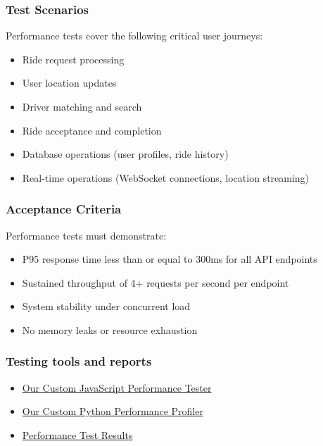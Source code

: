 \documentclass[a4paper,12pt]{article}
\begin{document}
\subsubsection{Test Scenarios}
Performance tests cover the following critical user journeys:
\begin{itemize}
    \item Ride request processing
    \item User location updates
    \item Driver matching and search
    \item Ride acceptance and completion
    \item Database operations (user profiles, ride history)
    \item Real-time operations (WebSocket connections, location streaming)
\end{itemize}

\subsubsection{Acceptance Criteria}
Performance tests must demonstrate:
\begin{itemize}
    \item P95 response time less than or equal to 300ms for all API endpoints
    \item Sustained throughput of 4+ requests per second per endpoint
    \item System stability under concurrent load
    \item No memory leaks or resource exhaustion
\end{itemize}

\subsubsection{Testing tools and reports}
\begin{itemize}
 \item \href{https://github.com/COS301-SE-2025/TaxiTap/blob/00164c31e7b00acd4b7aab6527f9ad9b59471b28/testing/performance/performance_tester.js}{Our Custom JavaScript Performance Tester}
 \item \href{https://github.com/COS301-SE-2025/TaxiTap/blob/00164c31e7b00acd4b7aab6527f9ad9b59471b28/testing/performance/performance_profiler.py}{Our Custom Python Performance Profiler}
 \item \href{https://github.com/COS301-SE-2025/TaxiTap/blob/08edee8eb80ad621eb2870fe2278270e8f335274/platform/performance_test_report_2025-10-19T15-25-53-966Z.json}{Performance Test Results}
\end{itemize}
\end{document}
